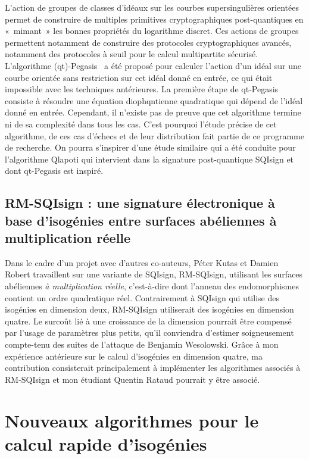 \documentclass[a4paper,10pt]{scrartcl}
\theoremstyle{definition}
\theoremstyle{plain}
\theoremstyle{definition}
\renewcommand{\(}{\left(}
\renewcommand{\)}{\right)}
\begin{document}
L'action de groupes de classes d'idéaux sur les courbes supersingulières orientées permet de construire de multiples primitives cryptographiques post-quantiques en «~mimant~» les bonnes propriétés du logarithme discret. Ces actions de groupes permettent notamment de construire des protocoles cryptographiques avancés, notamment des protocoles à seuil pour le calcul multipartite sécurisé. L'algorithme (qt)-Pegasis~\cite{PEGASIS,qt_Pegasis} a été proposé pour calculer l'action d'un idéal sur une courbe orientée sans restriction sur cet idéal donné en entrée, ce qui était impossible avec les techniques antérieures. La première étape de qt-Pegasis consiste à résoudre une équation diophqntienne quadratique qui dépend de l'idéal donné en entrée. Cependant, il n'existe pas de preuve que cet algorithme termine ni de sa complexité dans tous les cas. C'est pourquoi l'étude précise de cet algorithme, de ces cas d'échecs et de leur distribution fait partie de ce programme de recherche. On pourra s'inspirer d'une étude similaire qui a été conduite pour l'algorithme Qlapoti \cite{Qlapoti,Qlapoty} qui intervient dans la signature post-quantique SQIsign et dont qt-Pegasis est inspiré.

\subsection{RM-SQIsign : une signature électronique à base d'isogénies entre surfaces abéliennes à multiplication réelle}

Dans le cadre d'un projet avec d'autres co-auteurs, Péter Kutas et Damien Robert travaillent sur une variante de SQIsign, RM-SQIsign, utilisant les surfaces abéliennes \emph{à multiplication réelle}, c'est-à-dire dont l'anneau des endomorphismes contient un ordre quadratique réel. Contrairement à SQIsign qui utilise des isogénies en dimension deux, RM-SQIsign utiliserait des isogénies en dimension quatre. Le surcoût lié à une croissance de la dimension pourrait être compensé par l'usage de paramètres plus petits, qu'il conviendra d'estimer soigneusement compte-tenu des suites de l'attaque de Benjamin Wesolowski. Grâce à mon expérience antérieure sur le calcul d'isogénies en dimension quatre, ma contribution consisterait principalement à implémenter les algorithmes associés à RM-SQIsign et mon étudiant Quentin Rataud pourrait y être associé.


\section{Nouveaux algorithmes pour le calcul rapide d'isogénies}\label{SecCalcIsog}
\end{document}
